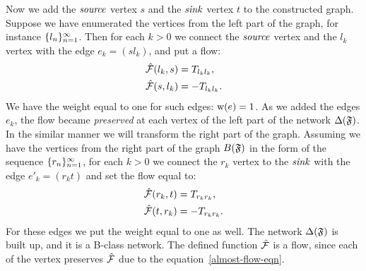 \documentclass[12pt]{article}
\begin{document}
    Now we add the $\mathit{source}$ vertex $s$ and the $\mathit{sink}$ vertex $t$ to the constructed graph.
    Suppose we have enumerated the vertices from the left part of the graph, for instance $\{{l}_n\}_{n=1}^\infty$.
    Then for each $k > 0$ we connect the $\mathit{source}$ vertex and the $l_k$ vertex with
      the edge $e_k = (s l_k)$, and put a flow:
    \begin{align*}
      &\mathcal{\hat{F}}(l_k, s) = T_{l_k l_k},\\
      &\mathcal{\hat{F}}(s, l_k) = -T_{l_k l_k}.
    \end{align*}
    We have the weight equal to one for such edges: $\mathrm{w}(e) = 1$.
    As we added the edges ${e_k}$, the flow became \emph{preserved} at each vertex of the left part of the network $\Delta(\mathfrak{F})$.
    In the similar manner we will transform the right part of the graph.
    Assuming we have the vertices from the right part of the graph $B(\mathfrak{F})$ in the form of the sequence $\{{r}_n\}_{n=1}^\infty$,
      for each $k > 0$ we connect the $r_k$ vertex to the $\mathit{sink}$ with the edge $e'_k=(r_k t)$
      and set the flow equal to:
    \begin{align*}
      &\mathcal{\hat{F}}(r_k, t) = T_{r_k r_k},\\
      &\mathcal{\hat{F}}(t, r_k) = -T_{r_k r_k}.
    \end{align*}
    For these edges we put the weight equal to one as well.
    The network $\Delta(\mathfrak{F})$ is built up, and it is a B-class network.
    The defined function $\mathcal{\hat{F}}$ is a flow, since each of the vertex preserves
      $\mathcal{\hat{F}}$ due to the equation~\eqref{almost-flow-eqn}.
\end{document}
